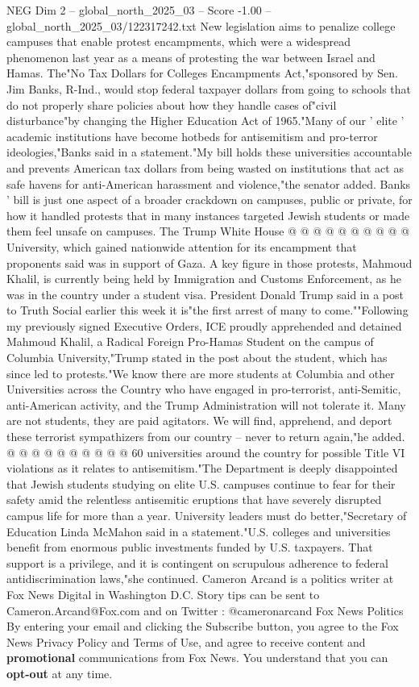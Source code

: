 \begin{textsample}{NEG Dim 2 – global\_north\_2025\_03 – Score -1.00 – global\_north\_2025\_03/122317242.txt}  \label{ex:f2_neg_039}
New legislation aims to penalize college campuses that enable protest encampments, which were a widespread phenomenon last year as a means of protesting the war between Israel and Hamas.
The"No Tax Dollars for Colleges Encampments Act,"sponsored by Sen.
Jim Banks, R-Ind., would stop federal taxpayer dollars from going to schools that do not properly share policies about how they handle cases of"civil disturbance"by changing the Higher Education Act of 1965."Many of our ' elite ' academic institutions have become hotbeds for antisemitism and pro-terror ideologies,"Banks said in a statement."My bill holds these universities accountable and prevents American tax dollars from being wasted on institutions that act as safe havens for anti-American harassment and violence,"the senator added.
Banks ' bill is just one aspect of a broader crackdown on campuses, public or private, for how it handled protests that in many instances targeted Jewish students or made them feel unsafe on campuses.
The Trump White House @ @ @ @ @ @ @ @ @ @ University, which gained nationwide attention for its encampment that proponents said was in support of Gaza.
A key figure in those protests, Mahmoud Khalil, is currently being held by Immigration and Customs Enforcement, as he was in the country under a student visa.
President Donald Trump said in a post to Truth Social earlier this week it is"the first arrest of many to come.""Following my previously signed Executive Orders, ICE proudly apprehended and detained Mahmoud Khalil, a Radical Foreign Pro-Hamas Student on the campus of Columbia University,"Trump stated in the post about the student, which has since led to protests."We know there are more students at Columbia and other Universities across the Country who have engaged in pro-terrorist, anti-Semitic, anti-American activity, and the Trump Administration will not tolerate it.
Many are not students, they are paid agitators.
We will find, apprehend, and deport these terrorist sympathizers from our country -- never to return again,"he added. @ @ @ @ @ @ @ @ @ @ 60 universities around the country for possible Title VI violations as it relates to antisemitism."The Department is deeply disappointed that Jewish students studying on elite U.S. campuses continue to fear for their safety amid the relentless antisemitic eruptions that have severely disrupted campus life for more than a year.
University leaders must do better,"Secretary of Education Linda McMahon said in a statement."U.S. colleges and universities benefit from enormous public investments funded by U.S. taxpayers.
That support is a privilege, and it is contingent on scrupulous adherence to federal antidiscrimination laws,"she continued.
Cameron Arcand is a politics writer at Fox News Digital in Washington D.C.
Story tips can be sent to Cameron.Arcand@Fox.com and on Twitter : @cameronarcand Fox News Politics By entering your email and clicking the Subscribe button, you agree to the Fox News Privacy Policy and Terms of Use, and agree to receive content and \textbf{promotional} communications from Fox News.
You understand that you can \textbf{opt-out} at any time.

\end{textsample}
